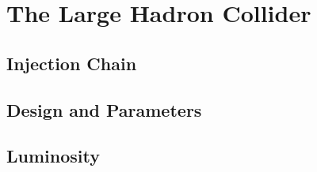 \chapter{The Large Hadron Collider}

\label{ch:lhc}

\section{Injection Chain}


\section{Design and Parameters}


\section{Luminosity}

